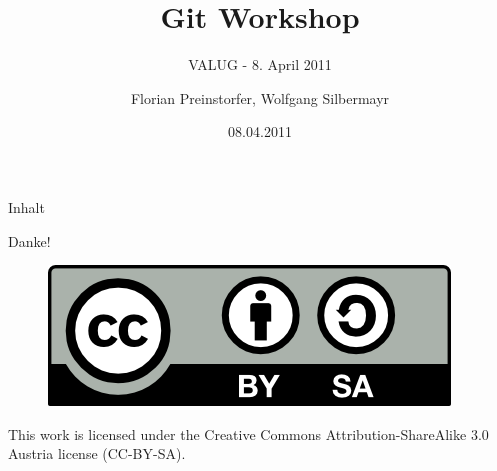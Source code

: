 \documentclass[%
]{beamer}
\title{Git Workshop}
\subtitle{VALUG - 8. April 2011}
\author[Florian Preinstorfer, Wolfgang Silbermayr]{Florian Preinstorfer, Wolfgang Silbermayr}
\date[valug - 08.04.2011]{08.04.2011}
\begin{document}
\frame[plain]{\titlepage}

\begin{frame}{Inhalt}
  \tableofcontents[pausesections]
\end{frame}


\begin{frame}[plain]
  \begin{center}
    \vspace{1cm}
    Danke!
    \vspace{3cm}
    \begin{figure}[!b]
      \includegraphics[scale=0.5]{img/by-sa}
    \end{figure}
    \tiny{This work is licensed under the Creative Commons Attribution-ShareAlike 3.0 Austria license (CC-BY-SA).}
\end{center}
\end{frame}
\end{document}
